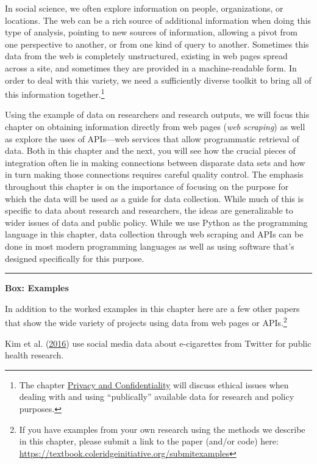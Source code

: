 \documentclass[]{krantz}
\begin{document}
In social science, we often explore information on people,
organizations, or locations. The web can be a rich source of additional
information when doing this type of analysis, pointing to new sources of
information, allowing a pivot from one perspective to another, or from
one kind of query to another. Sometimes this data from the web is
completely unstructured, existing in web pages spread across a site, and
sometimes they are provided in a machine-readable form. In order to deal
with this variety, we need a sufficiently diverse toolkit to bring all
of this information together.\footnote{The chapter
  \protect\hyperlink{chap:privacy}{Privacy and Confidentiality} will
  discuss ethical issues when dealing with and using ``publically''
  available data for research and policy purposes.}

Using the example of data on researchers and research outputs, we will
focus this chapter on obtaining information directly from web pages
(\emph{web scraping}) as well as explore the uses of APIs---web services
that allow programmatic retrieval of data. Both in this chapter and the
next, you will see how the crucial pieces of integration often lie in
making connections between disparate data sets and how in turn making
those connections requires careful quality control. The emphasis
throughout this chapter is on the importance of focusing on the purpose
for which the data will be used as a guide for data collection. While
much of this is specific to data about research and researchers, the
ideas are generalizable to wider issues of data and public policy. While
we use Python as the programming language in this chapter, data
collection through web scraping and APIs can be done in most modern
programming languages as well as using software that's designed
specifically for this purpose.

\begin{center}\rule{0.5\linewidth}{\linethickness}\end{center}

\textbf{Box: Examples}

In addition to the worked examples in this chapter here are a few other
papers that show the wide variety of projects using data from web pages
or APIs.\footnote{If you have examples from your own research using the
  methods we describe in this chapter, please submit a link to the paper
  (and/or code) here:
  \url{https://textbook.coleridgeinitiative.org/submitexamples}}

Kim et al. (\protect\hyperlink{ref-Kim2016}{2016}) use social media data
about e-cigarettes from Twitter for public health research.
\end{document}

